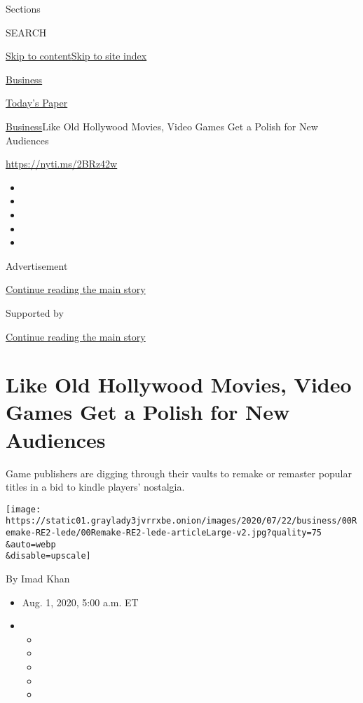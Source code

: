 Sections

SEARCH

\protect\hyperlink{site-content}{Skip to
content}\protect\hyperlink{site-index}{Skip to site index}

\href{https://www.nytimes3xbfgragh.onion/section/business}{Business}

\href{https://myaccount.nytimes3xbfgragh.onion/auth/login?response_type=cookie\&client_id=vi}{}

\href{https://www.nytimes3xbfgragh.onion/section/todayspaper}{Today's
Paper}

\href{/section/business}{Business}\textbar{}Like Old Hollywood Movies,
Video Games Get a Polish for New Audiences

\url{https://nyti.ms/2BRz42w}

\begin{itemize}
\item
\item
\item
\item
\item
\end{itemize}

Advertisement

\protect\hyperlink{after-top}{Continue reading the main story}

Supported by

\protect\hyperlink{after-sponsor}{Continue reading the main story}

\hypertarget{like-old-hollywood-movies-video-games-get-a-polish-for-new-audiences}{%
\section{Like Old Hollywood Movies, Video Games Get a Polish for New
Audiences}\label{like-old-hollywood-movies-video-games-get-a-polish-for-new-audiences}}

Game publishers are digging through their vaults to remake or remaster
popular titles in a bid to kindle players' nostalgia.

\texttt{[image: https://static01.graylady3jvrrxbe.onion/images/2020/07/22/business/00Remake-RE2-lede/00Remake-RE2-lede-articleLarge-v2.jpg?quality=75\\\&auto=webp\\\&disable=upscale]}

By Imad Khan

\begin{itemize}
\item
  Aug. 1, 2020, 5:00 a.m. ET
\item
  \begin{itemize}
  \item
  \item
  \item
  \item
  \item
  \end{itemize}
\end{itemize}

